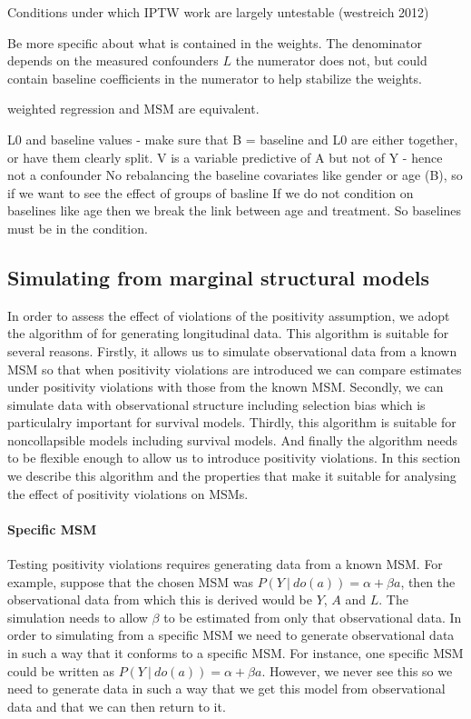 \documentclass[11pt]{article}
\begin{document}
Conditions under which IPTW work are largely untestable (westreich 2012)

Be more specific about what is contained in the weights. The denominator
depends on the measured confounders \(L\) the numerator does not, but
could contain baseline coefficients in the numerator to help stabilize
the weights.

weighted regression and MSM are equivalent.

L0 and baseline values - make sure that B = baseline and L0 are either
together, or have them clearly split. V is a variable predictive of A
but not of Y - hence not a confounder No rebalancing the baseline
covariates like gender or age (B), so if we want to see the effect of
groups of basline If we do not condition on baselines like age then we
break the link between age and treatment. So baselines must be in the
condition.

    \subsection{Simulating from marginal structural
models}\label{simulating-from-marginal-structural-models}

In order to assess the effect of violations of the positivity
assumption, we adopt the algorithm of \citet{Havercroft2012} for
generating longitudinal data. This algorithm is suitable for several
reasons. Firstly, it allows us to simulate observational data from a
known MSM so that when positivity violations are introduced we can
compare estimates under positivity violations with those from the known
MSM. Secondly, we can simulate data with observational structure
including selection bias which is particulalry important for survival
models. Thirdly, this algorithm is suitable for noncollapsible models
including survival models. And finally the algorithm needs to be
flexible enough to allow us to introduce positivity violations. In this
section we describe this algorithm and the properties that make it
suitable for analysing the effect of positivity violations on MSMs.

\paragraph{Specific MSM}\label{specific-msm}

Testing positivity violations requires generating data from a known MSM.
For example, suppose that the chosen MSM was
\(P(Y\ |\ do(a)) = \alpha + \beta a\), then the observational data from
which this is derived would be \(Y\), \(A\) and \(L\). The simulation
needs to allow \(\beta\) to be estimated from only that observational
data. In order to simulating from a specific MSM we need to generate
observational data in such a way that it conforms to a specific MSM. For
instance, one specific MSM could be written as
\(P(Y\ |\ do(a)) = \alpha + \beta a\). However, we never see this so we
need to generate data in such a way that we get this model from
observational data and that we can then return to it.
\end{document}
